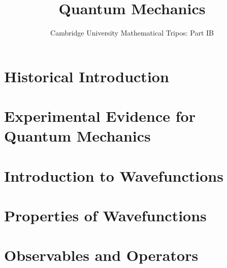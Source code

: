 \documentclass{article}
\title{Quantum Mechanics}
\author{Cambridge University Mathematical Tripos: Part IB}
\begin{document}
\maketitle

\tableofcontentsnewpage{}

\section{Historical Introduction}

\section{Experimental Evidence for Quantum Mechanics}

\section{Introduction to Wavefunctions}

\section{Properties of Wavefunctions}

\section{Observables and Operators}

\end{document}

